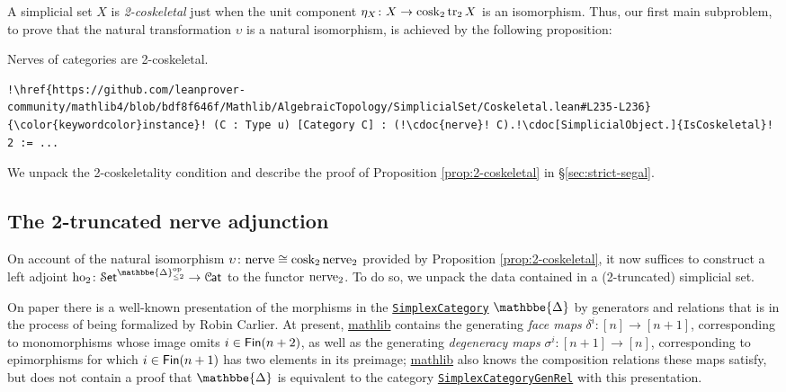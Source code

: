 \documentclass[a4paper,UKenglish,cleveref, autoref, thm-restate]{lipics-v2021}
\newcommand{\op}{\textup{op}}
\newcommand{\cosk}{\textup{cosk}}
\newcommand{\tr}{\textup{tr}}
\newcommand{\ho}{\textup{ho}}
\newcommand{\nerve}{\textup{nerve}}
\newcommand{\cat}[1]{\textup{\textsf{#1}}}%
\newcommand{\1}{\mathbbe{1}}
\newcommand{\2}{\mathbbe{2}}
\newcommand{\3}{\mathbbe{3}}
\newcommand{\DDelta}{\mathbbe{\Delta}}
\newcommand{\Fin}{\cat{Fin}}
\newcommand{\Cat}{\mathcal{C}{\kern-.75pt}\cat{at}}
\newcommand{\Set}{\mathcal{S}\cat{et}}
\newcommand{\libmathlib}{\href{https://github.com/leanprover-community/mathlib}{\textsf{mathlib}}}
\newcommand{\ldoc}[2][]{\href{https://leanprover-community.github.io/mathlib4_docs/find/?pattern=#1#2\#doc}{\texttt{#2}}}
\newcommand{\cdoc}[2][]{\href{https://leanprover-community.github.io/mathlib4_docs/find/?pattern=CategoryTheory.#1#2\#doc}{\texttt{#2}}}
\begin{document}
A simplicial set $X$ is \emph{2-coskeletal} just when the unit component $\eta_X \colon X \to \cosk_2\,\tr_2\,X$ is an isomorphism. Thus, our first main subproblem, to prove that the natural transformation $\upsilon$ is a natural isomorphism, is achieved by the following proposition:

\begin{proposition}[{\ldoc[SSet.StrictSegal.]{isCoskeletal}}]\label{prop:2-coskeletal}
Nerves of categories are 2-coskeletal.
\end{proposition}
\begin{lstlisting}
!\href{https://github.com/leanprover-community/mathlib4/blob/bdf8f646f/Mathlib/AlgebraicTopology/SimplicialSet/Coskeletal.lean#L235-L236}{\color{keywordcolor}instance}! (C : Type u) [Category C] : (!\cdoc{nerve}! C).!\cdoc[SimplicialObject.]{IsCoskeletal}! 2 := ...
\end{lstlisting}

We unpack the 2-coskeletality condition and describe the proof of Proposition \ref{prop:2-coskeletal} in \S\ref{sec:strict-segal}.

\subsection{The 2-truncated nerve adjunction}\label{sec:ho2}

On account of the natural isomorphism $\upsilon \colon \nerve \cong \cosk_2\,\nerve_2$ provided by Proposition \ref{prop:2-coskeletal}, it now suffices to construct a left adjoint $\ho_2 \colon \Set^{\DDelta_{\leq 2}^\op} \to \Cat$ to the functor $\nerve_2$. To do so, we unpack the data contained in a (2-truncated) simplicial set.

On paper there is a well-known presentation of the morphisms in the \ldoc{SimplexCategory} $\DDelta$ by generators and relations \cite[\S I.1]{goerss-jardine} that is in the process of being formalized by Robin Carlier. At present, \libmathlib{} contains the generating \emph{face maps} $\delta^i \colon [n] \to [n + 1]$, corresponding to monomorphisms whose image omits $i \in \Fin(n + 2)$, as well as the generating \emph{degeneracy maps} $\sigma^i \colon [n + 1] \to [n]$, corresponding to epimorphisms for which $i \in \Fin(n+1)$ has two elements in its preimage; \libmathlib{} also knows the composition relations these maps satisfy, but does not contain a proof that $\DDelta$ is equivalent to the category \ldoc{SimplexCategoryGenRel} with this presentation.
\end{document}
